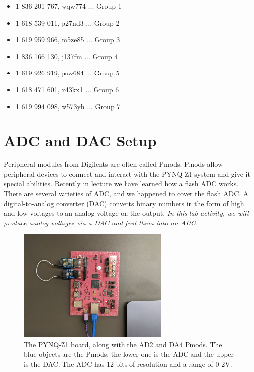 \documentclass{article}
\begin{document}
\begin{itemize}
\item 1 836 201 767, wqw774 ... Group 1
\item 1 618 539 011, p27nd3 ... Group 2
\item 1 619 959 966, m5ze85 ... Group 3
\item 1 836 166 130, j137fm ... Group 4
\item 1 619 926 919, psw684 ... Group 5
\item 1 618 471 601, x43kx1 ... Group 6
\item 1 619 994 098, w573yh ... Group 7
\end{itemize}

\section{ADC and DAC Setup}

Peripheral modules from Digilents are often called Pmods.  Pmods allow peripheral devices to connect and interact with the PYNQ-Z1 system and give it special abilities.  Recently in lecture we have learned how a flash ADC works.  There are several varieties of ADC, and we happened to cover the flash ADC.  A digital-to-analog converter (DAC) converts binary numbers in the form of high and low voltages to an analog voltage on the output.  \textit{In this lab activity, we will produce analog voltages via a DAC and feed them into an ADC.}

\begin{figure}[ht]
\centering
\includegraphics[width=0.65\textwidth]{IMG_20200408_121757.jpg}
\caption{\label{fig:setup1} The PYNQ-Z1 board, along with the AD2 and DA4 Pmods.  The blue objects are the Pmods: the lower one is the ADC and the upper is the DAC.  The ADC has 12-bits of resolution and a range of 0-2V.}
\end{figure}
\end{document}
